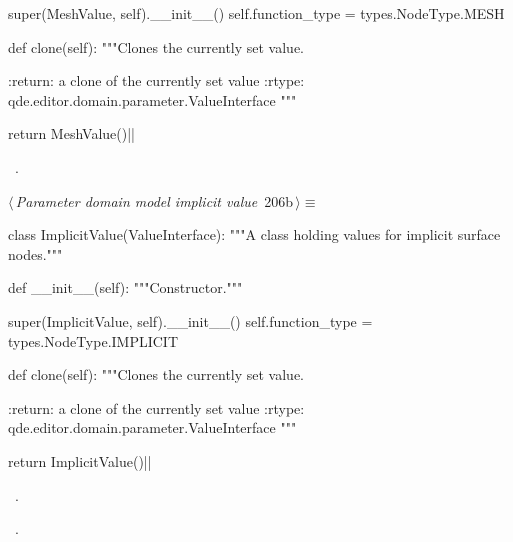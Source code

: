 \documentclass[%
    a4paper,    %
    justified,  %
    nobib,      %
    openany     %
]{tufte-book}
\makeatletter
\renewcommand{\label}[1]{\@tufte@label{##1}}%
\makeatother
\begin{document}
\begin{fullwidth}
\begin{flushleft}
\begin{minipage}{\linewidth}
\begin{pythoncode}
        super(MeshValue, self).__init__()
        self.function_type = types.NodeType.MESH

    def clone(self):
        """Clones the currently set value.

        :return: a clone of the currently set value
        :rtype:  qde.editor.domain.parameter.ValueInterface
        """

        return MeshValue()|\NWsep|
\end{pythoncode}
\vspace{1.5ex}
\footnotesize
\begin{list}{}{\setlength{\itemsep}{-\parsep}\setlength{\itemindent}{-\leftmargin}}
\item \NWtxtMacroRefIn\ .

\item{}
\end{list}
\end{minipage}\vspace{4ex}
\end{flushleft}
\begin{flushleft} \small
\begin{minipage}{\linewidth}\label{scrap202}\raggedright\small
{} $\langle\,${\itshape Parameter domain model implicit value}\nobreak\ {\footnotesize {206b}}$\,\rangle\equiv$
\vspace{-1ex}
\begin{pythoncode}
class ImplicitValue(ValueInterface):
    """A class holding values for implicit surface nodes."""

    def __init__(self):
        """Constructor."""

        super(ImplicitValue, self).__init__()
        self.function_type = types.NodeType.IMPLICIT

    def clone(self):
        """Clones the currently set value.

        :return: a clone of the currently set value
        :rtype:  qde.editor.domain.parameter.ValueInterface
        """

        return ImplicitValue()|\NWsep|
\end{pythoncode}
\vspace{1.5ex}
\footnotesize
\begin{list}{}{\setlength{\itemsep}{-\parsep}\setlength{\itemindent}{-\leftmargin}}
\item \NWtxtMacroDefBy\ .
\item \NWtxtMacroRefIn\ .


\end{list}
\end{minipage}
\end{flushleft}
\end{fullwidth}
\end{document}
